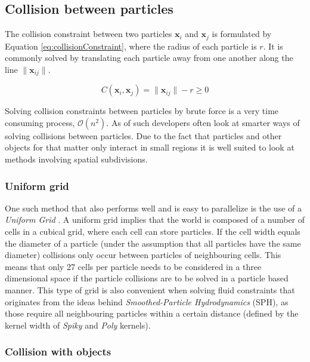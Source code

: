 \subsection{Collision between particles}

The collision constraint between two particles $ \mathbf{x}_{i} $ and $ \mathbf{x}_{j} $ is formulated by Equation \ref{eq:collisionConstraint}, where the radius of each particle is $ r $. It is commonly solved by translating each particle away from one another along the line $ \| \mathbf{x}_{ij} \| $.

\begin{equation} \label{eq:collisionConstraint}
  C(\mathbf{x}_{i}, \mathbf{x}_{j}) = \| \mathbf{x}_{ij} \| - r \geq 0 
\end{equation}

Solving collision constraints between particles by brute force is a very time consuming process, $\mathcal{O}(n^{2})$. As of such developers often look at smarter ways of solving collisions between particles. Due to the fact that particles and other objects for that matter only interact in small regions it is well suited to look at methods involving spatial subdivisions. 

\subsubsection{Uniform grid}

One such method that also performs well and is easy to parallelize is the use of a \textit{Uniform Grid} \cite{Green}. A uniform grid implies that the world is composed of a number of cells in a cubical grid, where each cell can store particles. If the cell width equals the diameter of a particle (under the assumption that all particles have the same diameter) collisions only occur between particles of neighbouring cells. This means that only 27 cells per particle needs to be considered in a three dimensional space if the particle collisions are to be solved in a particle based manner. This type of grid is also convenient when solving fluid constraints that originates from the ideas behind \textit{Smoothed-Particle Hydrodynamics} (SPH), as those require all neighbouring particles within a certain distance (defined by the kernel width of \textit{Spiky} and \textit{Poly} kernels).

\subsubsection{Collision with objects}

